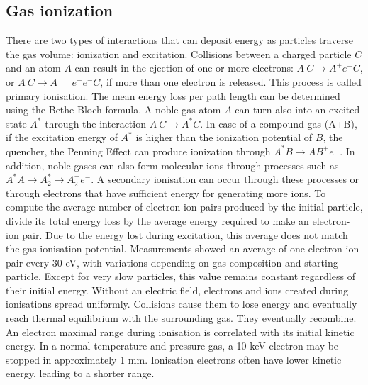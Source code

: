 \subsection{Gas ionization}
There are two types of interactions that can deposit energy as particles traverse the gas volume: ionization and excitation.
Collisions between a charged particle $C$ and an atom $A$ can result in the ejection of one or more electrons: 
$A \ C \rightarrow A^+ e^- C$, or $A \ C \rightarrow A^{++} e^- e^- C$, if more than one electron is released.
This process is called primary ionisation. The mean energy loss per path length can be determined using the Bethe-Bloch formula.
A noble gas atom $A$ can turn also into an excited state $A^*$ through the interaction $A \ C \rightarrow A^* C$. 
In case of a compound gas (A+B), if the excitation energy of $A^*$ is higher 
than the ionization potential of $B$, the quencher, the
Penning Effect can produce ionization through $A^*B \rightarrow A B^+ e^-$.
In addition, noble gases can
also form molecular ions through processes such as $A^* A \rightarrow A_{2}^{*} \rightarrow A^+_2 e^-$.
A secondary ionisation can occur through these processes or through electrons that have sufficient energy for generating more ions.
To compute the average number of electron-ion pairs produced by the initial particle,
divide its total energy loss by the average energy required to make an electron-ion pair.
Due to the energy lost during excitation, this average 
does not match the gas ionisation potential. Measurements showed an average of one electron-ion pair every 
30 eV, with variations depending on gas composition and starting particle. Except for very slow particles, 
this value remains constant regardless of their initial energy.
Without an electric field, electrons and ions created during ionisations spread uniformly. 
Collisions cause them to lose energy and eventually reach thermal equilibrium with the surrounding gas. 
They eventually recombine. An electron maximal range during ionisation is correlated with its initial kinetic 
energy. In a normal temperature and pressure gas, a 10 keV electron may be stopped in approximately 1 mm. 
Ionisation electrons often have lower kinetic energy,
leading to a shorter range.
